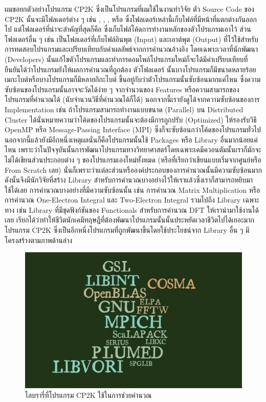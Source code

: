ผมขอยกตัวอย่างโปรแกรม CP2K ซึ่งเป็นโปรแกรมที่ผมใช้ในงานทำวิจัย ตัว Source Code ของ CP2K นั้นจะมีโฟลเดอร์ต่าง ๆ เช่น , , , หรือ  ซึ่งโฟลเดอร์เหล่านี้เก็บไฟล์ที่มีหน้าที่แตกต่างกันออกไป แต่โฟลเดอร์ที่น่าจะสำคัญที่สุดก็คือ  ซึ่งเก็บไฟล์โค้ดการทำงานหลักของตัวโปรแกรมเอาไว้ ส่วนโฟลเดอร์อื่น ๆ เช่น  เป็นโฟลเดอร์ที่เก็บไฟล์อินพุต (Input) และเอาต์พุต (Output) ที่ไว้ใช้สำหรับการทดสอบโปรแกรมและเปรียบเทียบกับค่าผลลัพธ์จากการคำนวณอ้างอิง โดยเฉพาะเวลาที่นักพัฒนา (Developers) นั้นแก้ไขตัวโปรแกรมและทำการคอมไพล์โปรแกรมใหม่ก็จะได้มีค่าเปรียบเทียบที่ยืนยันได้ว่าโปรแกรมยังให้ผลการคำนวณที่ถูกต้อง ตัวโฟลเดอร์  นั้นบางโปรแกรมก็มีขนาดหลายร้อยเมกะไบต์หรือบางโปรแกรมก็มีหลายกิกะไบต์ ขึ้นอยู่กับว่าตัวโปรแกรมนั้นซับซ้อนมากแค่ไหน ซึ่งความซับซ้อนของโปรแกรมนั้นอาจจะวัดได้ง่าย ๆ จากจำนวนของ Features หรือความสามารถของโปรแกรมที่คำนวณได้ (นับจำนวนวิธีที่คำนวณได้ก็ได้) นอกจากนี้เรายังดูได้จากความซับซ้อนของการ Implementation เช่น ถ้าโปรแกรมสามารถทำงานแบบขนาด (Parallel) บน Distributed Cluster ได้นั่นหมายความว่าโค้ดของโปรแกรมนั้นจะต้องมีการถูกปรับ (Optimized) ให้รองรับวิธี OpenMP หรือ Message-Passing Interface (MPI) ซึ่งก็จะซับซ้อนกว่าโค้ดของโปรแกรมทั่วไป นอกจากนี้แล้วยังมีอีกหนึ่งเหตุผลนั่นก็คือโปรแกรมนั้นใช้ Packages หรือ Library อื่นมากน้อยแค่ไหน เพราะว่าในปัจจุบันนั้นการพัฒนาโปรแกรมทางวิทยาศาสตร์โดยเฉพาะเคมีควอนตัมนั้นเราก็มักจะไม่ได้เขียนส่วนประกอบต่าง ๆ ของโปรแกรมเองใหม่ทั้งหมด (หรือที่เรียกว่าเขียนแบบเริ่มจากศูนย์หรือ From Scratch เลย) นั่นก็เพราะว่าแต่ละส่วนหรือองค์ประกอบของการคำนวณนั้นมีความซับซ้อนมาก ดังนั้นจึงมีนักวิจัยที่สร้าง Library สำหรับการคำนวณบางอย่างไว้ให้เราแล้วซึ่งเราก็สามารถหยิบมาใช้ได้เลย การคำนวณบางอย่างที่มีความซับซ้อนนั้น เช่น การคำนวณ Matrix Multiplication หรือการคำนวณ One-Electron Integral และ Two-Electron Integral รวมไปถึง Library เฉพาะทาง เช่น Library ที่มีชุดฟังก์ชันของ Functionals สำหรับการคำนวณ DFT ให้เรานำมาใช้งานได้เลย เรียกได้ว่าทำให้ชีวิตนักเคมีทฤษฎีที่ต้องพัฒนาโปรแกรมนั้นนั้นประหยัดเวลาชีวิตไปได้เยอะมาก โปรแกรม CP2K ซึ่งเป็นอีกหนึ่งโปรแกรมที่ถูกพัฒนาขึ้นโดยใช้ประโยชน์จาก Library อื่น ๆ มีโครงสร้างตามภาพด้านล่าง

\begin{figure}[H]
  \centering
  \includegraphics[width=0.5\linewidth]{fig/cp2k-lib.jpg}
  \caption{ไลบรารี่ที่โปรแกรม CP2K ใช้ในการช่วยคำนวณ}
  \label{fig:cp2k_lib}
\end{figure}

